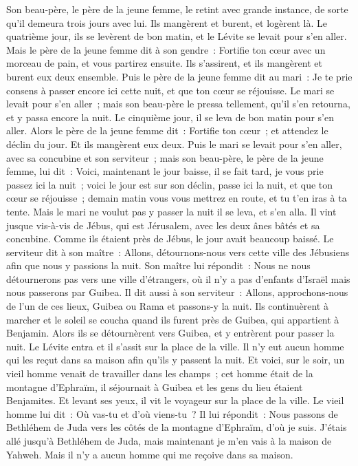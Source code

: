 \begin{multicols}{2}
Son beau-père, le père de la jeune femme, le retint avec grande instance, de sorte qu'il demeura trois jours avec lui. Ils mangèrent et burent, et logèrent là.
Le quatrième jour, ils se levèrent de bon matin, et le Lévite se levait pour s'en aller. Mais le père de la jeune femme dit à son gendre~: Fortifie ton cœur avec un morceau de pain, et vous partirez ensuite.
Ils s'assirent, et ils mangèrent et burent eux deux ensemble. Puis le père de la jeune femme dit au mari~: Je te prie consens à passer encore ici cette nuit, et que ton cœur se réjouisse.
Le mari se levait pour s'en aller~; mais son beau-père le pressa tellement, qu'il s'en retourna, et y passa encore la nuit.
Le cinquième jour, il se leva de bon matin pour s'en aller. Alors le père de la jeune femme dit~: Fortifie ton cœur~; et attendez le déclin du jour. Et ils mangèrent eux deux.
Puis le mari se levait pour s'en aller, avec sa concubine et son serviteur~; mais son beau-père, le père de la jeune femme, lui dit~: Voici, maintenant le jour baisse, il se fait tard, je vous prie passez ici la nuit~; voici le jour est sur son déclin, passe ici la nuit, et que ton cœur se réjouisse~; demain matin vous vous mettrez en route, et tu t'en iras à ta tente.
Mais le mari ne voulut pas y passer la nuit il se leva, et s'en alla. Il vint jusque vis-à-vis de Jébus, qui est Jérusalem, avec les deux ânes bâtés et sa concubine.
Comme ils étaient près de Jébus, le jour avait beaucoup baissé. Le serviteur dit à son maître~: Allons, détournons-nous vers cette ville des Jébusiens afin que nous y passions la nuit.
Son maître lui répondit~: Nous ne nous détournerons pas vers une ville d'étrangers, où il n'y a pas d'enfants d'Israël mais nous passerons par Guibea.
Il dit aussi à son serviteur~: Allons, approchons-nous de l'un de ces lieux, Guibea ou Rama et passons-y la nuit.
Ils continuèrent à marcher et le soleil se coucha quand ils furent près de Guibea, qui appartient à Benjamin.
Alors ils se détournèrent vers Guibea, et y entrèrent pour passer la nuit. Le Lévite entra et il s'assit sur la place de la ville. Il n'y eut aucun homme qui les reçut dans sa maison afin qu'ils y passent la nuit.
Et voici, sur le soir, un vieil homme venait de travailler dans les champs~; cet homme était de la montagne d'Ephraïm, il séjournait à Guibea et les gens du lieu étaient Benjamites.
Et levant ses yeux, il vit le voyageur sur la place de la ville. Le vieil homme lui dit~: Où vas-tu et d'où viens-tu~?
Il lui répondit~: Nous passons de Bethléhem de Juda vers les côtés de la montagne d'Ephraïm, d'où je suis. J'étais allé jusqu'à Bethléhem de Juda, mais maintenant je m'en vais à la maison de Yahweh. Mais il n'y a aucun homme qui me reçoive dans sa maison.

\end{multicols}
